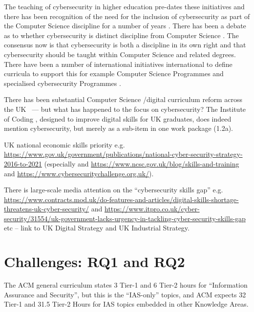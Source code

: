 \documentclass[conference]{IEEEtran}
\begin{document}
The teaching of cybersecurity in higher education pre-dates these initiatives and there has been recognition of the need for the inclusion of cybersecurity as part of the Computer Science discipline for a number of years \cite{Hentea2006}. There has  been a debate as to whether cybersecurity is distinct discipline from Computer Science \cite{McGettreick2013}. The consensus now is that cybersecurity is both a discipline in its own right and that cybersecurity should be taught within Computer Science and related degrees. There have been a number of international initiatives international to define curricula to support this for example Computer Science Programmes  \cite[which added ``Information Assurance and Security'' for the first time]{ACM2013a} and specialised cybersecurity Programmes \cite{ACMIEEEAISSIGSECIFIP}.


There has been substantial Computer Science /digital curriculum reform across the
UK~\cite{crick+sentance:2011,brown-et-al:sigcse2013,wgictreview:2013,brown-et-al:toce2014,moller+crick:jce2018}
--- but what has happened to the focus on cybersecurity?  The Institute of Coding \cite{Davenportetal2019a}, designed to improve digital skills for UK graduates, does indeed mention cybersecurity, but merely as a sub-item in one work package (1.2a).

UK national economic skills priority
e.g. \url{https://www.gov.uk/government/publications/national-cyber-security-strategy-2016-to-2021}
(especially \cite{JCNSS2018a}
and \url{https://www.ncsc.gov.uk/blog/skills-and-training} and
\url{https://www.cybersecuritychallenge.org.uk/}). 

There is large-scale media
attention on the ``cybersecurity skills gap''
e.g. \url{https://www.contracts.mod.uk/do-features-and-articles/digital-skills-shortage-threatens-uk-cyber-security/}
and
\url{https://www.itpro.co.uk/cyber-security/31554/uk-government-lacks-urgency-in-tackling-cyber-security-skills-gap}
etc -- link to UK Digital Strategy and UK Industrial Strategy.

\section{Challenges: RQ1 and RQ2}

The ACM general curriculum \cite{ACM2013a} states 3 Tier-1 and 6 Tier-2 hours for ``Information Assurance and Security'', but this is the ``IAS-only'' topics, and ACM expects 32 Tier-1 and 31.5 Tier-2 Hours for IAS topics embedded in other Knowledge Areas.
\end{document}

